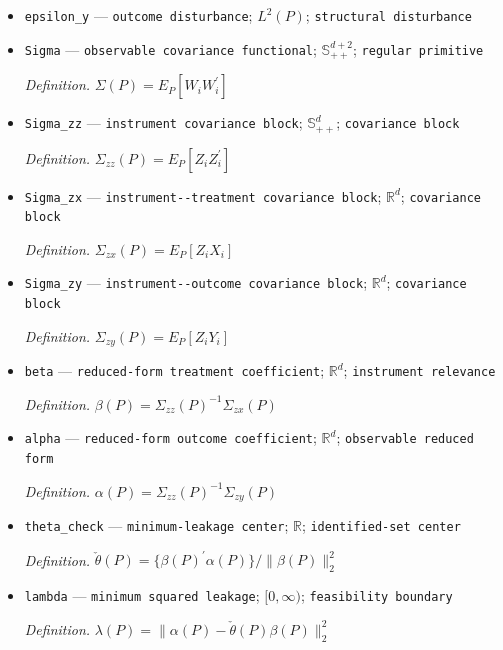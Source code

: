 \documentclass{article}
\begin{document}
\begin{itemize}
  \item \texttt{epsilon\_\allowbreak{}y} --- \texttt{outcome disturbance}; \(L^2(P)\); \texttt{structural disturbance}
  \item \texttt{Sigma} --- \texttt{observable covariance functional}; \(\mathbb S_{++}^{d+2}\); \texttt{regular primitive}
  \par\smallskip\noindent\emph{Definition.} \(\Sigma(P)=E_P[W_iW_i^{\prime}]\)
  \item \texttt{Sigma\_\allowbreak{}zz} --- \texttt{instrument covariance block}; \(\mathbb S_{++}^{d}\); \texttt{covariance block}
  \par\smallskip\noindent\emph{Definition.} \(\Sigma_{zz}(P)=E_P[Z_iZ_i^{\prime}]\)
  \item \texttt{Sigma\_\allowbreak{}zx} --- \texttt{instrument-\allowbreak{}-\allowbreak{}treatment covariance block}; \(\mathbb R^d\); \texttt{covariance block}
  \par\smallskip\noindent\emph{Definition.} \(\Sigma_{zx}(P)=E_P[Z_iX_i]\)
  \item \texttt{Sigma\_\allowbreak{}zy} --- \texttt{instrument-\allowbreak{}-\allowbreak{}outcome covariance block}; \(\mathbb R^d\); \texttt{covariance block}
  \par\smallskip\noindent\emph{Definition.} \(\Sigma_{zy}(P)=E_P[Z_iY_i]\)
  \item \texttt{beta} --- \texttt{reduced-\allowbreak{}form treatment coefficient}; \(\mathbb R^d\); \texttt{instrument relevance}
  \par\smallskip\noindent\emph{Definition.} \(\beta(P)=\Sigma_{zz}(P)^{-1}\Sigma_{zx}(P)\)
  \item \texttt{alpha} --- \texttt{reduced-\allowbreak{}form outcome coefficient}; \(\mathbb R^d\); \texttt{observable reduced form}
  \par\smallskip\noindent\emph{Definition.} \(\alpha(P)=\Sigma_{zz}(P)^{-1}\Sigma_{zy}(P)\)
  \item \texttt{theta\_\allowbreak{}check} --- \texttt{minimum-\allowbreak{}leakage center}; \(\mathbb R\); \texttt{identified-\allowbreak{}set center}
  \par\smallskip\noindent\emph{Definition.} \(\check\theta(P)=\{\beta(P)^{\prime}\alpha(P)\}/\|\beta(P)\|_2^2\)
  \item \texttt{lambda} --- \texttt{minimum squared leakage}; \([0,\infty)\); \texttt{feasibility boundary}
  \par\smallskip\noindent\emph{Definition.} \(\lambda(P)=\|\alpha(P)-\check\theta(P)\beta(P)\|_2^2\)

\end{itemize}
\end{document}
